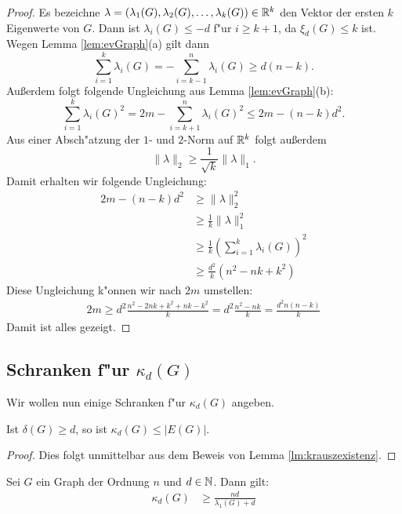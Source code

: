 \begin{proof}
  Es bezeichne $\lambda = (\lambda_{1}(G),\lambda_{2}(G), \dots , \lambda_{k}(G))\in {\mathbb{R}}^{k}$ den Vektor der ersten $k$ Eigenwerte von $G$. Dann ist $\lambda_{i}(G) \leq -d$ f"ur $i \geq k+1$, da $\xi_{d}(G) \leq k$ ist.
  Wegen Lemma \ref{lem:evGraph}(a) gilt dann 
  $$
    \sum\limits_{i=1}^{k} \lambda_{i}(G) = - \sum\limits_{i=k-1}^{n} \lambda_{i}(G) \geq d(n-k).
    $$
  Au{\ss}erdem folgt folgende Ungleichung aus Lemma \ref{lem:evGraph}(b):
  $$ \sum\limits_{i=1}^{k} \lambda_{i}(G)^{2} = 2m - \sum\limits_{i=k+1}^{n} \lambda_{i}(G) ^{2} \leq 2m - (n-k)d^{2}.$$
  Aus einer Absch"atzung der $1$- und $2$-Norm auf ${\mathbb{R}}^{k}$ folgt au{\ss}erdem 
  $$\| \lambda \|_{2} \geq \frac{1}{\sqrt{k}} \|\lambda\|_{1}.$$
  Damit erhalten wir folgende Ungleichung:
  \begin{align*}
    2m - (n-k)d^{2} &\geq \| \lambda \| _{2}^{2} \\
    & \geq \frac{1}{k} \| \lambda \| _1^{2} \\
    & \geq \frac{1}{k} ( \sum\limits_{i=1}^{k} \lambda_{i}(G))^{2} \\
    & \geq \frac{d^{2}}{k}(n^{2}-nk+k^{2})
  \end{align*}
  Diese Ungleichung k"onnen wir nach $2m$ umstellen:
\begin{align*}
  2m \geq d^{2}\frac{n^{2}-2nk + k^{2}+ nk - k^{2} }{k} = d^{2}\frac{n^{2}-nk}{k} = \frac{d^{2}n(n-k)}{k}
\end{align*}
Damit ist alles gezeigt. 
\end{proof}
\subsection{Schranken f"ur $\kappa_d(G)$}

Wir wollen nun einige Schranken f"ur $\kappa_{d}(G)$ angeben. 
\begin{lemma}
  Ist $\delta(G) \geq d$, so ist $\kappa_{d}(G) \leq |E(G)|$. 
\end{lemma}
\begin{proof}
  Dies folgt unmittelbar aus dem Beweis von Lemma \ref{lm:krauszexistenz}. 
\end{proof}

\begin{theorem}
  Sei $G$ ein Graph der Ordnung $n$ und $d\in {\mathbb{N}}$. Dann gilt:
  \begin{align*}
    \kappa_{d}(G) &\geq \frac{nd}{\lambda_{1}(G) +d} 
  \end{align*}
  \label{thm:kappaineq1}
\end{theorem}


